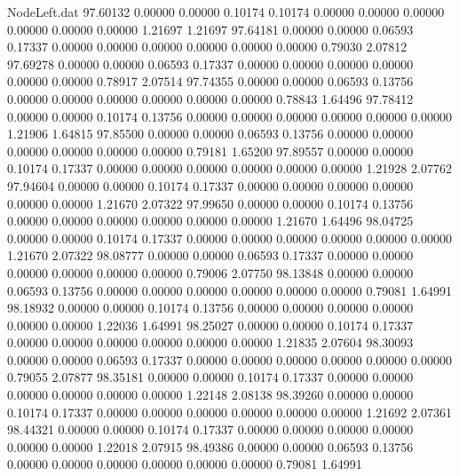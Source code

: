 \begin{filecontents}{NodeLeft.dat}
  97.60132    0.00000    0.00000     0.10174    0.10174    0.00000    0.00000    0.00000    0.00000    0.00000    0.00000    1.21697    1.21697
  97.64181    0.00000    0.00000     0.06593    0.17337    0.00000    0.00000    0.00000    0.00000    0.00000    0.00000    0.79030    2.07812
  97.69278    0.00000    0.00000     0.06593    0.17337    0.00000    0.00000    0.00000    0.00000    0.00000    0.00000    0.78917    2.07514
  97.74355    0.00000    0.00000     0.06593    0.13756    0.00000    0.00000    0.00000    0.00000    0.00000    0.00000    0.78843    1.64496
  97.78412    0.00000    0.00000     0.10174    0.13756    0.00000    0.00000    0.00000    0.00000    0.00000    0.00000    1.21906    1.64815
  97.85500    0.00000    0.00000     0.06593    0.13756    0.00000    0.00000    0.00000    0.00000    0.00000    0.00000    0.79181    1.65200
  97.89557    0.00000    0.00000     0.10174    0.17337    0.00000    0.00000    0.00000    0.00000    0.00000    0.00000    1.21928    2.07762
  97.94604    0.00000    0.00000     0.10174    0.17337    0.00000    0.00000    0.00000    0.00000    0.00000    0.00000    1.21670    2.07322
  97.99650    0.00000    0.00000     0.10174    0.13756    0.00000    0.00000    0.00000    0.00000    0.00000    0.00000    1.21670    1.64496
  98.04725    0.00000    0.00000     0.10174    0.17337    0.00000    0.00000    0.00000    0.00000    0.00000    0.00000    1.21670    2.07322
  98.08777    0.00000    0.00000     0.06593    0.17337    0.00000    0.00000    0.00000    0.00000    0.00000    0.00000    0.79006    2.07750
  98.13848    0.00000    0.00000     0.06593    0.13756    0.00000    0.00000    0.00000    0.00000    0.00000    0.00000    0.79081    1.64991
  98.18932    0.00000    0.00000     0.10174    0.13756    0.00000    0.00000    0.00000    0.00000    0.00000    0.00000    1.22036    1.64991
  98.25027    0.00000    0.00000     0.10174    0.17337    0.00000    0.00000    0.00000    0.00000    0.00000    0.00000    1.21835    2.07604
  98.30093    0.00000    0.00000     0.06593    0.17337    0.00000    0.00000    0.00000    0.00000    0.00000    0.00000    0.79055    2.07877
  98.35181    0.00000    0.00000     0.10174    0.17337    0.00000    0.00000    0.00000    0.00000    0.00000    0.00000    1.22148    2.08138
  98.39260    0.00000    0.00000     0.10174    0.17337    0.00000    0.00000    0.00000    0.00000    0.00000    0.00000    1.21692    2.07361
  98.44321    0.00000    0.00000     0.10174    0.17337    0.00000    0.00000    0.00000    0.00000    0.00000    0.00000    1.22018    2.07915
  98.49386    0.00000    0.00000     0.06593    0.13756    0.00000    0.00000    0.00000    0.00000    0.00000    0.00000    0.79081    1.64991

\end{filecontents}

